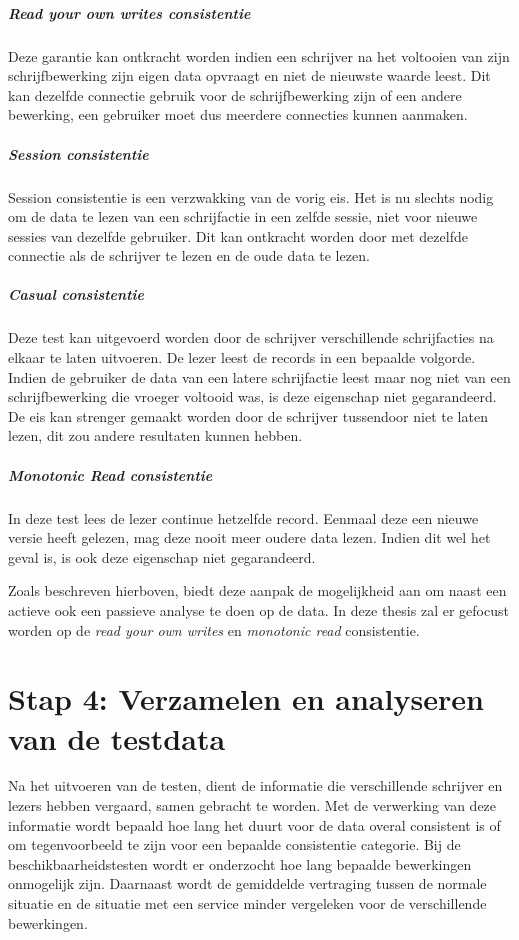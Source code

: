 \subparagraph{Read your own writes consistentie} Deze garantie kan ontkracht worden indien een schrijver na het voltooien van zijn schrijfbewerking zijn eigen data opvraagt en niet de nieuwste waarde leest. Dit kan dezelfde connectie gebruik voor de schrijfbewerking zijn of een andere bewerking, een gebruiker moet dus meerdere connecties kunnen aanmaken.  

\subparagraph{Session consistentie} Session consistentie is een verzwakking van de vorig eis. Het is nu slechts nodig om de data te lezen van een schrijfactie in een zelfde sessie, niet voor nieuwe sessies van dezelfde gebruiker. Dit kan ontkracht worden door met dezelfde connectie als de schrijver te lezen en de oude data te lezen. 

\subparagraph{Casual consistentie} Deze test kan uitgevoerd worden door de schrijver verschillende schrijfacties na elkaar te laten uitvoeren. De lezer leest de records in een bepaalde volgorde. Indien de gebruiker de data van een latere schrijfactie leest maar nog niet van een schrijfbewerking die vroeger voltooid was, is deze eigenschap niet gegarandeerd. De eis kan strenger gemaakt worden door de schrijver tussendoor niet te laten lezen, dit zou andere resultaten kunnen hebben.

\subparagraph{Monotonic Read consistentie} In deze test lees de lezer continue hetzelfde record. Eenmaal deze een nieuwe versie heeft gelezen, mag deze nooit meer oudere data lezen. Indien dit wel het geval is, is ook deze eigenschap niet gegarandeerd. 

Zoals beschreven hierboven, biedt deze aanpak de mogelijkheid aan om naast een actieve ook een passieve analyse te doen op de data. In deze thesis zal er gefocust worden op de \textit{read your own writes} en \textit{monotonic read} consistentie. 

\section{Stap 4: Verzamelen en analyseren van de testdata}
Na het uitvoeren van de testen, dient de informatie die verschillende schrijver en lezers hebben vergaard, samen gebracht te worden. Met de verwerking van deze informatie wordt bepaald hoe lang het duurt voor de data overal consistent is of om  tegenvoorbeeld te zijn voor een bepaalde consistentie categorie. Bij de beschikbaarheidstesten wordt er onderzocht hoe lang bepaalde bewerkingen onmogelijk zijn. Daarnaast wordt de gemiddelde vertraging tussen de normale situatie en de situatie met een service minder vergeleken voor de verschillende bewerkingen.  


